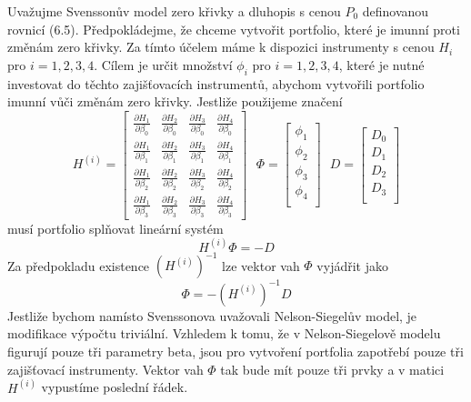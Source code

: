 \documentclass[a4paper]{book}
\begin{document}
Uvažujme Svenssonův model zero křivky a dluhopis s cenou $P_0$ definovanou rovnicí (6.5). Předpokládejme, že chceme vytvořit portfolio, které je imunní proti změnám zero křivky. Za tímto účelem máme k dispozici instrumenty s cenou $H_i$ pro $i = 1, 2, 3, 4$. Cílem je určit množství $\phi_i$ pro $i = 1, 2, 3, 4$, které je nutné investovat do těchto zajišťovacích instrumentů, abychom vytvořili portfolio imunní vůči změnám zero křivky. Jestliže použijeme značení
\begin{equation*}
H^{(i)} =
\begin{bmatrix}
\frac{\partial H_1}{\partial \beta_0} & \frac{\partial H_2}{\partial \beta_0} & \frac{\partial H_3}{\partial \beta_0} & \frac{\partial H_4}{\partial \beta_0} \\
\frac{\partial H_1}{\partial \beta_1} & \frac{\partial H_2}{\partial \beta_1} & \frac{\partial H_3}{\partial \beta_1} & \frac{\partial H_4}{\partial \beta_1} \\
\frac{\partial H_1}{\partial \beta_2} & \frac{\partial H_2}{\partial \beta_2} & \frac{\partial H_3}{\partial \beta_2} & \frac{\partial H_4}{\partial \beta_2} \\
\frac{\partial H_1}{\partial \beta_3} & \frac{\partial H_2}{\partial \beta_3} & \frac{\partial H_3}{\partial \beta_3} & \frac{\partial H_4}{\partial \beta_3}
\end{bmatrix}
~~~
\Phi =
\begin{bmatrix}
\phi_1 \\
\phi_2 \\
\phi_3 \\
\phi_4 \\
\end{bmatrix}
~~~
D =
\begin{bmatrix}
D_0 \\
D_1 \\
D_2 \\
D_3 \\
\end{bmatrix}
\end{equation*}
musí portfolio splňovat lineární systém
\begin{equation*}
H^{(i)} \Phi = -D
\end{equation*}
Za předpokladu existence $(H^{(i)})^{-1}$ lze vektor vah $\Phi$ vyjádřit jako
\begin{equation*}
\Phi = - (H^{(i)})^{-1}D
\end{equation*}
Jestliže bychom namísto Svenssonova uvažovali Nelson-Siegelův model, je modifikace výpočtu triviální. Vzhledem k tomu, že v Nelson-Siegelově modelu figurují pouze tři parametry beta, jsou pro vytvoření portfolia zapotřebí pouze tři zajišťovací instrumenty. Vektor vah $\Phi$ tak bude mít pouze tři prvky a v matici $H^{(i)}$ vypustíme poslední řádek.
\end{document}
